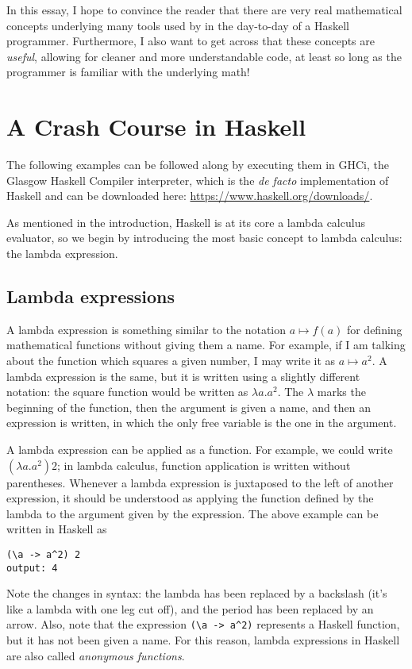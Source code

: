 \documentclass[11	pt]{article}
\theoremstyle{nonumberplain}
\begin{document}
In this essay, I hope to convince the reader that there are very real mathematical concepts underlying many tools used by in the day-to-day of a Haskell programmer. Furthermore, I also want to get across that these concepts are \emph{useful}, allowing for cleaner and more understandable code, at least so long as the programmer is familiar with the underlying math!

\section{A Crash Course in Haskell}

The following examples can be followed along by executing them in GHCi, the Glasgow Haskell Compiler interpreter, which is the \textit{de facto} implementation of Haskell and can be downloaded here: \url{https://www.haskell.org/downloads/}.

As mentioned in the introduction, Haskell is at its core a lambda calculus evaluator, so we begin by introducing the most basic concept to lambda calculus: the lambda expression.

\subsection{Lambda expressions}

A lambda expression is something similar to the notation $a \mapsto f(a)$ for defining mathematical functions without giving them a name. For example, if I am talking about the function which squares a given number, I may write it as $a \mapsto a^2$. A lambda expression is the same, but it is written using a slightly different notation: the square function would be written as $\lambda a. a^2$. The $\lambda$ marks the beginning of the function, then the argument is given a name, and then an expression is written, in which the only free variable is the one in the argument.

A lambda expression can be applied as a function. For example, we could write $(\lambda a. a^2) 2$; in lambda calculus, function application is written without parentheses. Whenever a lambda expression is juxtaposed to the left of another expression, it should be understood as applying the function defined by the lambda to the argument given by the expression. The above example can be written in Haskell as
\begin{lstlisting}
(\a -> a^2) 2
output: 4
\end{lstlisting}

Note the changes in syntax: the lambda has been replaced by a backslash (it's like a lambda with one leg cut off), and the period has been replaced by an arrow. Also, note that the expression \lstinline|(\a -> a^2)| represents a Haskell function, but it has not been given a name. For this reason, lambda expressions in Haskell are also called \emph{anonymous functions}.
\end{document}
